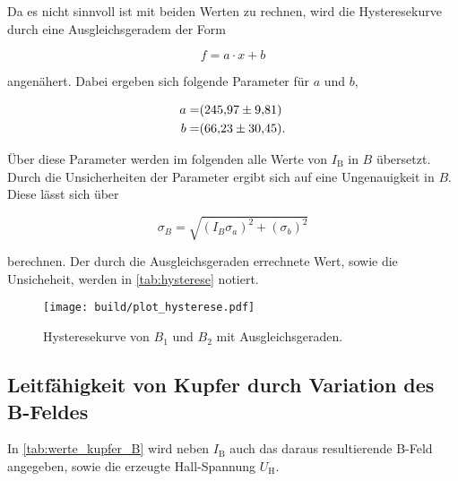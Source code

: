 Da es nicht sinnvoll ist mit beiden Werten zu rechnen, wird die Hysteresekurve durch eine Ausgleichsgeradem der Form

\begin{equation}
    f = a \cdot x + b
    \label{eq:gerade}
\end{equation}

angenähert.
Dabei ergeben sich folgende Parameter für $a$ und $b$,

\begin{align*}
    a =& \SI{245.97+-9.81}{} \\
    b =& \SI{66.23+-30.45}{}.
    \label{eq:params1}
\end{align*}

Über diese Parameter werden im folgenden alle Werte von $I_\text{B}$ in $B$ übersetzt.
Durch die Unsicherheiten der Parameter ergibt sich auf eine Ungenauigkeit in $B$.
Diese lässt sich über

\begin{equation}
    \sigma _B = \sqrt{\left(I_B \sigma _a \right)^2 + \left(\sigma _b \right)^2}
    \label{eq:B_fehler}
\end{equation}

berechnen.
Der durch die Ausgleichsgeraden errechnete Wert, sowie die Unsicheheit, werden in \autoref{tab:hysterese} notiert.

\begin{figure}
    \centering
    \texttt{[image: build/plot\_hysterese.pdf]}
    \caption{Hysteresekurve von $B_1$ und $B_2$ mit Ausgleichsgeraden.\cite{numpy}}
    \label{fig:hysterese_plot}
\end{figure}

\subsection{Leitfähigkeit von Kupfer durch Variation des B-Feldes}
\label{ssec:b}

In \autoref{tab:werte_kupfer_B} wird neben $I_\text{B}$ auch das daraus resultierende B-Feld angegeben, sowie die erzeugte Hall-Spannung $U_\text{H}$.

